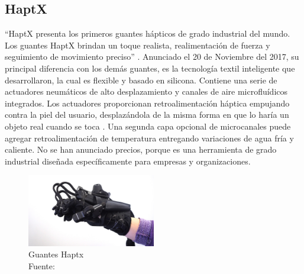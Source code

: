 \subsection{HaptX}

``HaptX presenta los primeros guantes hápticos de grado industrial del mundo. Los guantes HaptX brindan un toque realista, realimentación de fuerza y seguimiento de movimiento preciso'' \cite{haptx-info-page}. %
Anunciado el 20 de Noviembre del 2017, su principal diferencia con los demás guantes, es la tecnología textil inteligente que desarrollaron, la cual es flexible y basado en silicona. Contiene una serie de actuadores neumáticos de alto desplazamiento y canales de aire microfluídicos integrados. Los actuadores proporcionan retroalimentación háptica empujando contra la piel del usuario, desplazándola de la misma forma en que lo haría un objeto real cuando se toca \citep{haptx-info-page}. Una segunda capa opcional de microcanales puede agregar retroalimentación de temperatura entregando variaciones de agua fría y caliente. No se han anunciado precios, porque es una herramienta de grado industrial diseñada específicamente para empresas y organizaciones.

\begin{figure}[H]
  \begin{center} 
   	\includegraphics[width=0.5\textwidth]{images/chapter02/haptx01.jpg} 
    \caption[Guantes Haptx]{Guantes Haptx \\Fuente: \cite{haptx-info-page}} 
    \label{fig:haptx}
  \end{center}
\end{figure}




